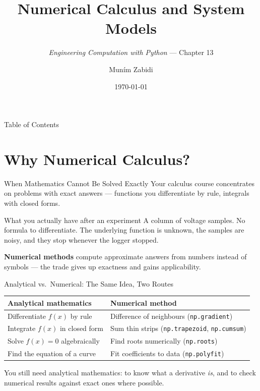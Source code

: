 \documentclass[9pt,aspectratio=169,xcolor=table]{beamer}
\title{Numerical Calculus and System Models}
\subtitle{\emph{Engineering Computation with Python} --- Chapter 13}
\author{Mun\'{i}m Zabidi}
\institute{\color{primary}Faculty of Electrical Engineering, Universiti Teknologi Malaysia}
\date{\today}
\begin{document}
\titlepage

\begin{frame}{Table of Contents}
    \tableofcontents
\end{frame}

\section{Why Numerical Calculus?}

\begin{frame}{When Mathematics Cannot Be Solved Exactly}
    \leavevmode
    Your calculus course concentrates on problems with exact answers ---
    functions you differentiate by rule, integrals with closed forms.

    \vspace{2mm}
    \begin{alertblock}{What you actually have after an experiment}
        A column of voltage samples. No formula to differentiate. The
        underlying function is unknown, the samples are noisy, and they
        stop whenever the logger stopped.
    \end{alertblock}

    \vspace{2mm}
    \textbf{Numerical methods} compute approximate answers from numbers
    instead of symbols --- the trade gives up exactness and gains
    \alert{applicability}.
\end{frame}

\begin{frame}{Analytical vs.\ Numerical: The Same Idea, Two Routes}
    \leavevmode
    \small
    \begin{center}
    \begin{tabular}{@{}p{5.0cm}p{6.6cm}@{}}
        \toprule
        \textbf{Analytical mathematics} & \textbf{Numerical method} \\
        \midrule
        Differentiate $f(x)$ by rule & Difference of neighbours
            (\texttt{np.gradient}) \\
        Integrate $f(x)$ in closed form & Sum thin strips
            (\texttt{np.trapezoid}, \texttt{np.cumsum}) \\
        Solve $f(x)=0$ algebraically & Find roots numerically
            (\texttt{np.roots}) \\
        Find the equation of a curve & Fit coefficients to data
            (\texttt{np.polyfit}) \\
        \bottomrule
    \end{tabular}
    \end{center}

    \vspace{2mm}
    {\small You still need analytical mathematics: to know what a
    derivative \emph{is}, and to check numerical results against exact
    ones where possible.}
\end{frame}
\end{document}

